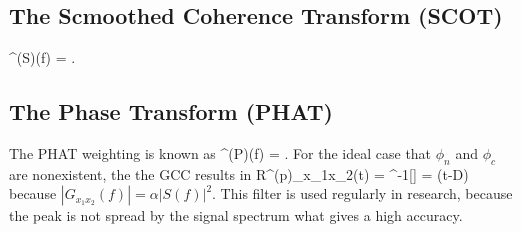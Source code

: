 \subsection{The Scmoothed Coherence Transform (SCOT)}
\bal
    \Psi^{(S)}(f) = .
\eal

\subsection{The Phase Transform (PHAT)}
The \ac{PHAT} weighting is known as
\bal
    \Psi^{(P)}(f) = .
\eal
For the ideal case that $\phi_n$ and $\phi_c$ are nonexistent, the the \ac{GCC} results in
\bal
    R^{(p)}_{x_1x_2}(t) = ^{-1}[] = \delta(t-D)
\eal
because $|G_{x_1x_2}(f)| = \alpha |S(f)|^2$.
This filter is used regularly in research, because the peak is not spread by the signal spectrum what gives
a high accuracy.

